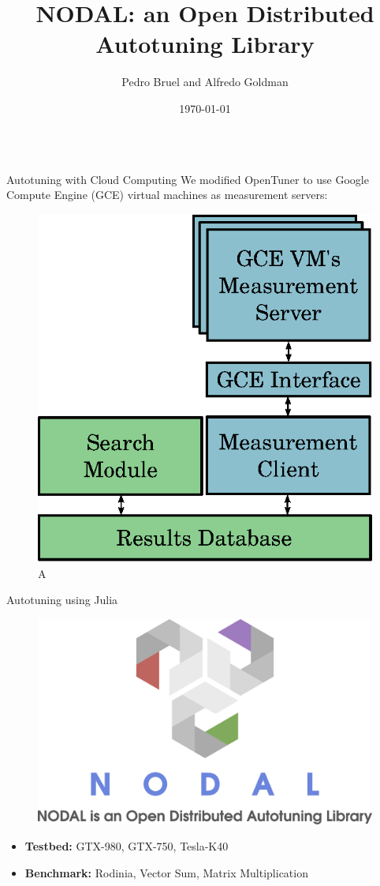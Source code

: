 \documentclass{beamer}
\title{NODAL: an Open Distributed Autotuning Library}
\author[phrb@ime.usp.br]{Pedro Bruel and Alfredo Goldman}
\institute{University of São Paulo, Brazil}
\date{\today}
\begin{document}
\begin{frame}
\begin{columns}[t]
    \begin{column}{.46\linewidth}
        \begin{block}{\Large Autotuning with Cloud Computing}
            \large
            We modified OpenTuner to use Google Compute Engine (GCE) virtual machines as
            measurement servers:
            \begin{figure}[htpb]
                \includegraphics[width=0.45\linewidth]{high-level-implementation.eps}
                \caption{A}
            \end{figure}
        \end{block}
        \begin{block}{\Large Autotuning using Julia}
            \large
            \begin{figure}[htpb]
                \includegraphics[width=0.84\linewidth]{logo}
            \end{figure}
            \begin{itemize}
                \item \textbf{Testbed:} GTX-980, GTX-750, Tesla-K40
                \item \textbf{Benchmark:} Rodinia, Vector Sum, Matrix Multiplication

\end{itemize}
\end{block}
\end{column}
\end{columns}
\end{frame}
\end{document}
